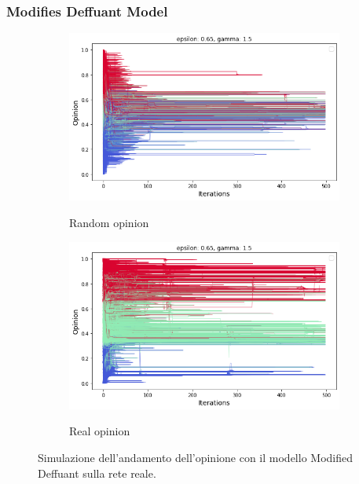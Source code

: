     \subsubsection{Modifies Deffuant Model}
    
      \begin{figure}
        \begin{subfigure}{.5\textwidth}
            \centering
            \caption{Random opinion}
            \includegraphics[scale=0.29]{Opinion dynamics/random_crawled_15_065.png}
            \label{fig:rdm_crw_15_065}
        \end{subfigure}
        \centering
        \begin{subfigure}{.5\textwidth}
            \centering
            \caption{Real opinion}
            \includegraphics[scale=0.29] {Opinion dynamics/real_crawled_15_065.png}
            \label{fig:real_crw_15_065}
        \end{subfigure}
        \caption{Simulazione dell'andamento dell'opinione con il modello Modified Deffuant sulla rete reale.}
        \label{fig:ModDeff}
    \end{figure}
    
